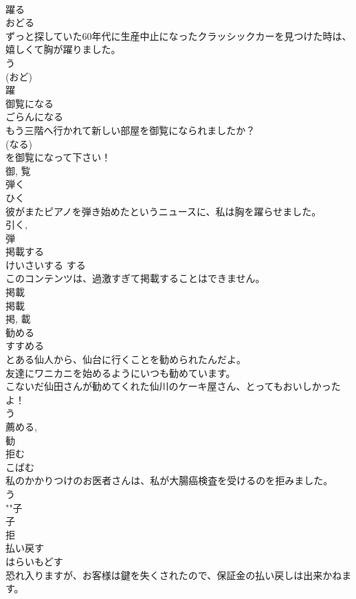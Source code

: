 \documentclass[8pt]{extreport}
\begin{document}
\begin{CJK}{UTF8}{min}
\\	躍る	
\\	おどる	
\\	ずっと探していた60年代に生産中止になったクラッシックカーを見つけた時は、嬉しくて胸が躍りました。	
\\	う 
\\	(おど) 
\\	躍	
\\	御覧になる	
\\	ごらんになる	
\\	もう三階へ行かれて新しい部屋を御覧になられましたか？	
\\	(なる) 
\\	を御覧になって下さい！	
\\	御, 覧	
\\	弾く	
\\	ひく	
\\	彼がまたピアノを弾き始めたというニュースに、私は胸を躍らせました。	
\\	引く, 
\\	弾	
\\	掲載する	
\\	けいさいする	する 
\\	このコンテンツは、過激すぎて掲載することはできません。	
\\	掲載 
\\	掲載 
\\	掲, 載	
\\	勧める	
\\	すすめる	
\\	とある仙人から、仙台に行くことを勧められたんだよ。	
\\	友達にワニカニを始めるようにいつも勧めています。	
\\	こないだ仙田さんが勧めてくれた仙川のケーキ屋さん、とってもおいしかったよ！	
\\	う 
\\	薦める, 
\\	勧	
\\	拒む	
\\	こばむ	
\\	私のかかりつけのお医者さんは、私が大腸癌検査を受けるのを拒みました。	
\\	う 
\\	""子 
\\	子 
\\	拒	
\\	払い戻す	
\\	はらいもどす	
\\	恐れ入りますが、お客様は鍵を失くされたので、保証金の払い戻しは出来かねます。	

\end{CJK}
\end{document}
